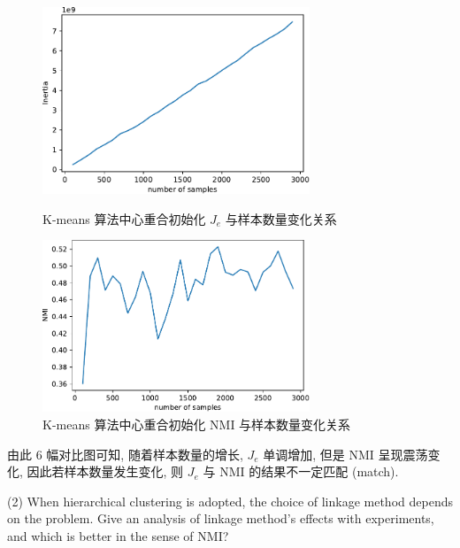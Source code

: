 \documentclass{article}
\begin{document}
\begin{figure}[htbp]
  \centering
  \begin{minipage}[t]{0.48\textwidth}
    \centering
    \includegraphics[width=8cm]{kmeans_innertia_coincide.pdf}
    \caption{K-means 算法中心重合初始化 $J_e$ 与样本数量变化关系}
    \label{fig:kmeans_innertia_coincide}
  \end{minipage}
  \begin{minipage}[t]{0.48\textwidth}
    \centering
    \includegraphics[width=8cm]{kmeans_nmi_coincide.pdf}
    \caption{K-means 算法中心重合初始化 NMI 与样本数量变化关系}
    \label{fig:kmeans_nmi_coincide}
  \end{minipage}
\end{figure}

由此 6 幅对比图可知, 随着样本数量的增长, $J_e$ 单调增加, 但是 NMI 呈现震荡变化, 因此若样本数量发生变化, 则 $J_e$ 与 NMI 的结果不一定匹配 (match).

(2) When hierarchical clustering is adopted, the choice of linkage method depends on the problem. Give an analysis of linkage method's effects with experiments, and which is better in the sense of NMI?
\end{document}
